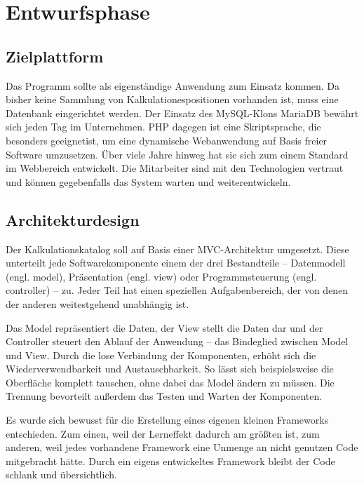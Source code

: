 \section{Entwurfsphase} 
\label{sec:Entwurfsphase}

\subsection{Zielplattform}
\label{sec:Zielplattform}
Das Programm sollte als eigenständige Anwendung zum Einsatz kommen. Da bisher
keine Sammlung von Kalkulationespositionen vorhanden ist, muss eine Datenbank
eingerichtet werden. Der Einsatz des My\acs{SQL}-Klons MariaDB bewährt sich
jeden Tag im Unternehmen. \acs{PHP} dagegen ist eine Skriptsprache, die
besonders geeignetist, um eine dynamische Webanwendung auf Basis freier
Software umzusetzen. Über viele Jahre hinweg hat sie sich zum einem Standard im
Webbereich entwickelt. Die Mitarbeiter sind mit den Technologien vertraut und
können gegebenfalls das System warten und weiterentwickeln.

\subsection{Architekturdesign}
\label{sec:Architekturdesign}
Der Kalkulationskatalog soll auf Basis einer \ac{MVC}-Architektur umgesetzt.
Diese unterteilt jede Softwarekomponente einem der drei
Bestandteile -- Datenmodell (engl. model), Präsentation (engl. view) oder
Programmsteuerung (engl. controller)\citet{ModelViewController} -- zu.
Jeder Teil hat einen speziellen Aufgabenbereich, der von denen der anderen weitestgehend unabhängig
ist. 

Das Model repräsentiert die Daten, der View stellt die Daten dar und der
Controller steuert den Ablauf der Anwendung -- das Bindeglied zwischen Model und
View. Durch die lose Verbindung der Komponenten, erhöht sich die
Wiederverwendbarkeit und Austauschbarkeit. So lässt sich beispielsweise die
Oberfläche komplett tauschen, ohne dabei das Model ändern zu müssen. Die
Trennung bevorteilt außerdem das Testen und Warten der Komponenten.

Es wurde sich bewusst für die Erstellung eines eigenen kleinen Frameworks
entschieden. Zum einen, weil der Lerneffekt dadurch am größten ist, zum anderen,
weil jedes vorhandene Framework eine Unmenge an nicht genutzen Code mitgebracht
hätte. Durch ein eigens entwickeltes Framework bleibt der Code schlank und
übersichtlich.

